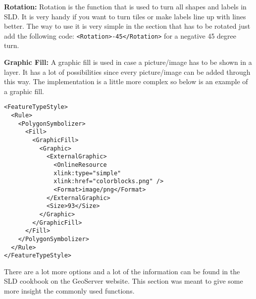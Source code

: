 \textbf{Rotation:} Rotation is the function that is used to turn all shapes and labels in SLD. It is very handy if you want to turn tiles or make labels line up with lines better. The way to use it is very simple in the section that has to be rotated just add the following code: \lstinline|<Rotation>-45</Rotation>| for a negative 45 degree turn.

\textbf{Graphic Fill:} A graphic fill is used in case a picture/image has to be shown in a layer. It has a lot of possibilities since every picture/image can be added through this way. The implementation is a little more complex so below is an example of a graphic fill. 
\begin{lstlisting}
<FeatureTypeStyle>
  <Rule>
    <PolygonSymbolizer>
      <Fill>
        <GraphicFill>
          <Graphic>
            <ExternalGraphic>
              <OnlineResource
              xlink:type="simple"
              xlink:href="colorblocks.png" />
              <Format>image/png</Format>
            </ExternalGraphic>
            <Size>93</Size>
          </Graphic>
        </GraphicFill>
      </Fill>
    </PolygonSymbolizer>
  </Rule>
</FeatureTypeStyle>
\end{lstlisting}
There are a lot more options and a lot of the information can be found in the SLD cookbook on the GeoServer website. This section was meant to give some more insight the commonly used functions.
  
